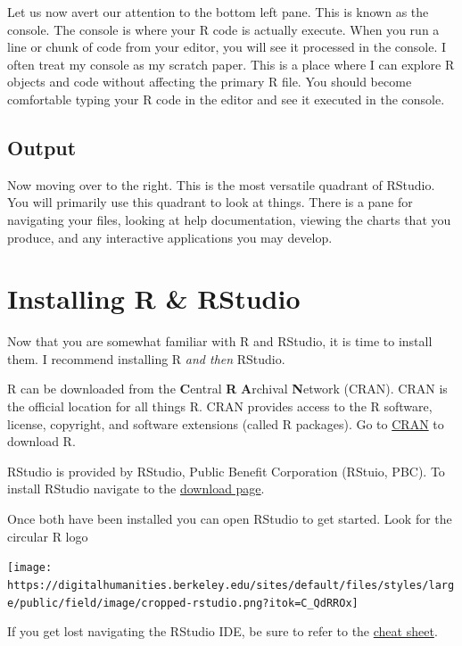 \documentclass[
]{book}
\begin{document}
Let us now avert our attention to the bottom left pane. This is known as the console. The console is where your R code is actually execute. When you run a line or chunk of code from your editor, you will see it processed in the console. I often treat my console as my scratch paper. This is a place where I can explore R objects and code without affecting the primary R file. You should become comfortable typing your R code in the editor and see it executed in the console.

\hypertarget{output}{%
\subsection{Output}\label{output}}

Now moving over to the right. This is the most versatile quadrant of RStudio. You will primarily use this quadrant to look at things. There is a pane for navigating your files, looking at help documentation, viewing the charts that you produce, and any interactive applications you may develop.

\hypertarget{installing-r-rstudio}{%
\section{Installing R \& RStudio}\label{installing-r-rstudio}}

Now that you are somewhat familiar with R and RStudio, it is time to install them. I recommend installing R \emph{and then} RStudio.

R can be downloaded from the \textbf{C}entral \textbf{R} \textbf{A}rchival \textbf{N}etwork (CRAN). CRAN is the official location for all things R. CRAN provides access to the R software, license, copyright, and software extensions (called R packages). Go to \href{https://cran.r-project.org/}{CRAN} to download R.

RStudio is provided by RStudio, Public Benefit Corporation (RStuio, PBC). To install RStudio navigate to the \href{https://rstudio.com/products/rstudio/download/\#download}{download page}.

Once both have been installed you can open RStudio to get started. Look for the circular R logo

\texttt{[image: https://digitalhumanities.berkeley.edu/sites/default/files/styles/large/public/field/image/cropped-rstudio.png?itok=C\_QdRROx]}

If you get lost navigating the RStudio IDE, be sure to refer to the \href{https://github.com/rstudio/cheatsheets/raw/master/rstudio-ide.pdf}{cheat sheet}.
\end{document}
